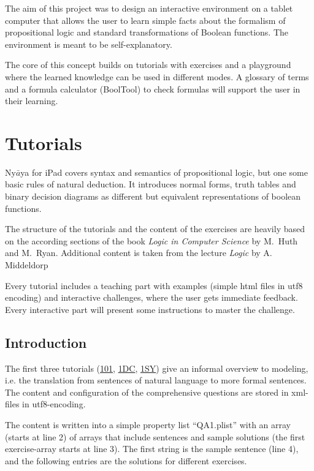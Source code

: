 
The aim of this project was to design an interactive environment on a tablet computer 
that allows the user to learn simple facts about the formalism of propositional logic 
and standard transformations of Boolean functions. 
The environment is meant to be self-explanatory. 

The core of this concept builds on tutorials with exercises 
and a playground where the learned knowledge can be used in different modes. 
A glossary of terms and a formula calculator (BoolTool) to check formulas will support the user in their learning.

\section{Tutorials}

Ny$\bar{a}$ya for iPad covers syntax and semantics of propositional logic, but one some basic rules of natural deduction. 
It introduces normal forms,
truth tables and binary decision diagrams as different but equivalent representations of boolean functions.

The structure of the tutorials and the content of the exercises are heavily based on the according sections of the book  
{\em Logic in Computer Science} \cite{Huth:2004:LCS:975331} by M.~Huth and M.~Ryan.
Additional content is taken from the lecture {\em Logic} \cite{Middeldorp:2012:LICS} by {A. Middeldorp}

Every tutorial includes a teaching part with examples (simple html files in utf8 encoding) and interactive challenges, 
where the user gets immediate feedback. Every interactive part will present some instructions to master the challenge.

\subsection{Introduction}

The first three tutorials (\hyperref[tut:101]{101}, \hyperref[tut:1DC]{1DC}, \hyperref[tut:1SY]{1SY}) give an informal overview to modeling, 
i.e. the translation from sentences of natural language to more formal sentences. 
The content and configuration of the comprehensive questions are stored in xml-files in utf8-encoding. 

The content is written into  a simple property list “QA1.plist”  
with an array (starts at line 2) 
of arrays that include sentences and sample solutions (the first exercise-array starts at line 3). 
The first string is the sample sentence (line 4), 
and the following entries are the solutions for different exercises. 

